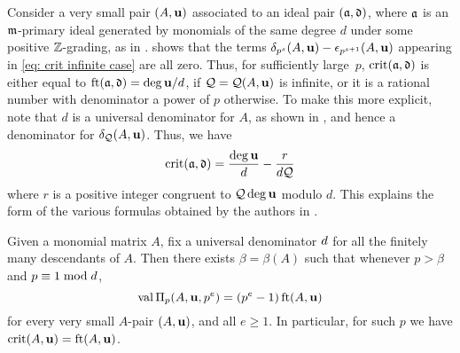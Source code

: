 \documentclass{amsart}
\begin{document}
\begin{remark}
   Consider a very small pair $(A,\mathbf{u})$ associated to an ideal pair $(\mathfrak{a},\mathfrak{d})$, where $\mathfrak{a}$ is an $\mathfrak{m}$-primary ideal generated by monomials of the same degree $d$ under some positive $\mathbb{Z}$-grading, as in .
    shows that the terms $\delta_{p^s}(A,\mathbf{u})-\epsilon_{p^{s+1}}(A,\mathbf{u})$ appearing in \eqref{eq: crit infinite case} are all zero.
   Thus, for sufficiently large~$p$, $\operatorname{crit}(\mathfrak{a},\mathfrak{d})$ is either equal to $\operatorname{ft}(\mathfrak{a}, \mathfrak{d}) = \deg \mathbf{u}/d$, if $\mathcal{Q}=\mathcal{Q}(A,\mathbf{u})$ is infinite, or it is a rational number with denominator a power of $p$ otherwise.
   To make this more explicit, note that $d$ is a universal denominator for $A$, as shown in , and hence a denominator for $\delta_{\mathcal{Q}}(A,\mathbf{u})$.
   Thus, we have
   \[\operatorname{crit}(\mathfrak{a},\mathfrak{d}) = \frac{\deg \mathbf{u}}{d} - \frac{r}{d\mathcal{Q}} \]
   where $r$ is a positive integer congruent to $\mathcal{Q}\deg\mathbf{u}$ modulo $d$.
   This explains the form of the various formulas obtained by the authors in \cite[Theorems~3.6, 4.8, and~5.5]{hernandez+etal.frobenius_examples}.
\end{remark}


\begin{proposition}
   Given a monomial matrix $A$, fix a universal denominator $d$ for all the finitely many descendants of $A$.
   Then there exists $\beta = \beta(A)$ such that whenever $p>\beta$ and $p \equiv 1 \bmod d$,
\[
 \operatorname{val}\Pi_p(A,\mathbf{u},p^e) = (p^e-1) \operatorname{ft}(A, \mathbf{u})
\]
for every very small $A$-pair $(A, \mathbf{u})$, and all $e \geq 1$.
In particular, for such $p$ we have $\operatorname{crit}(A,\mathbf{u}) = \operatorname{ft}(A, \mathbf{u})$.
\end{proposition}
\end{document}
